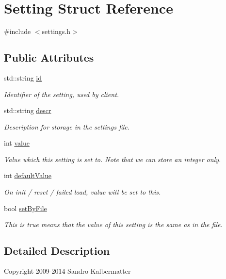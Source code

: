 \hypertarget{structSetting}{}\section{Setting Struct Reference}
\label{structSetting}


{\ttfamily \#include $<$settings.\+h$>$}

\subsection*{Public Attributes}
\begin{DoxyCompactItemize}
\item 
std\+::string \hyperlink{structSetting_a399631faac36a18e73a9a2b0a8a5f047}{id}
\begin{DoxyCompactList}\small\item\em Identifier of the setting, used by client. \end{DoxyCompactList}\item 
std\+::string \hyperlink{structSetting_ae26ca1222bbcbacab256a130037566db}{descr}
\begin{DoxyCompactList}\small\item\em Description for storage in the settings file. \end{DoxyCompactList}\item 
int \hyperlink{structSetting_a047cbc28fb542450105ad9fbfe746167}{value}
\begin{DoxyCompactList}\small\item\em Value which this setting is set to. Note that we can store an integer only. \end{DoxyCompactList}\item 
int \hyperlink{structSetting_aefa3ae7274f798b1bc25b0ba37b0f4e9}{default\+Value}
\begin{DoxyCompactList}\small\item\em On init / reset / failed load, value will be set to this. \end{DoxyCompactList}\item 
bool \hyperlink{structSetting_acac9d129d2c3fd8059a2087878f1b687}{set\+By\+File}
\begin{DoxyCompactList}\small\item\em This is true means that the value of this setting is the same as in the file. \end{DoxyCompactList}\end{DoxyCompactItemize}


\subsection{Detailed Description}
Copyright 2009-\/2014 Sandro Kalbermatter

